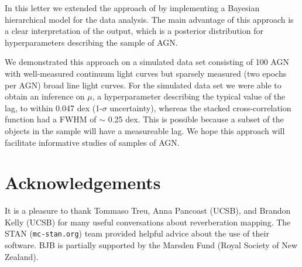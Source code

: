 \documentclass[useAMS,usenatbib]{mn2e}
\begin{document}
In this letter we extended the approach of \citet{2012MNRAS.427.2701F} by
implementing a Bayesian hierarchical model for the data analysis. The main
advantage of this approach is a clear interpretation of the output, which is
a posterior distribution for hyperparameters describing the sample of AGN.

We demonstrated this approach on a simulated data set consisting of 100 AGN
with well-measured continuum light curves but sparsely measured (two epochs per
AGN) broad line light curves. For the simulated data set we were able to obtain
an inference on $\mu$, a hyperparameter describing the typical value of the lag,
to within 0.047 dex (1-$\sigma$ uncertainty), whereas the stacked cross-correlation
function had a FWHM of $\sim$ 0.25 dex. This is possible because a subset of
the objects in the sample will have a measureable lag. We hope this approach
will facilitate informative studies of samples of AGN.

\section*{Acknowledgements}
It is a pleasure to thank Tommaso Treu, Anna Pancoast (UCSB), and
Brandon Kelly (UCSB) for many
useful conversations about reverberation mapping. The STAN ({\tt mc-stan.org})
team provided helpful advice about the use of their software. BJB is partially
supported by the Marsden Fund (Royal Society of New Zealand).
\end{document}
